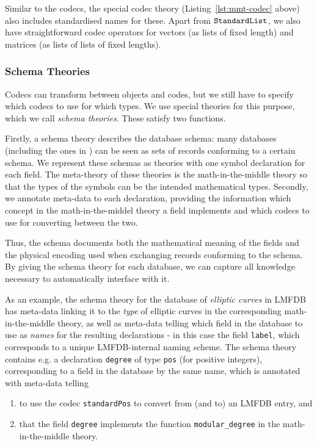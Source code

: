 Similar to the codecs, the special \MMT codec theory (Listing~\ref{lst:mmt-codec} above) also includes standardised names for these.
Apart from $\standardList$, we also have straightforward codec operators for vectors (as lists of fixed length) and matrices (as lists of lists of fixed lengths).

\subsubsection{Schema Theories}


Codecs can transform between \MMT objects and codes, but we still have to specify which codecs to use for which types.
We use special theories for this purpose, which we call \emph{schema theories}.
These satisfy two functions.

Firstly, a schema theory describes the database schema: many databases (including the ones in \LMFDB) can be seen as sets of records conforming to a certain schema.
We represent these schemas as \MMT theories with one symbol declaration for each field.
The meta-theory of these theories is the math-in-the-middle theory so that the types of the symbols can be the intended mathematical types.
Secondly, we annotate meta-data to each declaration, providing the information which concept in the math-in-the-middel theory a field implements and which codecs to use for converting between the two.

Thus, the schema documents both the mathematical meaning of the fields and the physical encoding used when exchanging records conforming to the schema.
By giving the schema theory for each database, we can capture all knowledge necessary to automatically interface with it.

As an example, the schema theory for the database of \emph{elliptic curves} in LMFDB
has meta-data linking it to the \emph{type} of elliptic curves in the corresponding math-in-the-middle theory, as well as meta-data telling \MMT which field in the database to use as \emph{names} for the resulting \MMT declarations - in this case the field \texttt{label}, which corresponds to a unique LMFDB-internal naming scheme. The schema theory contains e.g. a declaration \texttt{degree} of type \texttt{pos} (for positive  integers), corresponding to a field in the database by the same name, which is annotated with meta-data telling \MMT
\begin{enumerate}
\item to use the codec \texttt{standardPos} to convert from (and to) an LMFDB entry, and
\item that the field \texttt{degree} implements the function \texttt{modular\_degree} in the math-in-the-middle theory.
\end{enumerate}


